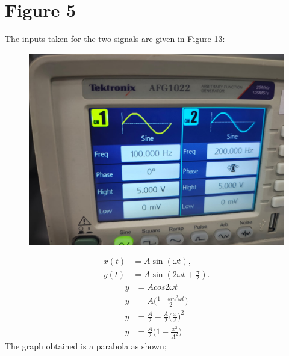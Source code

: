 \documentclass[a4paper,12pt]{article}
\numberwithin{equation}{section} %
\begin{document}
\section{Figure 5}
The inputs taken for the two signals are given in Figure 13:
\begin{figure}[h!]
    \centering
    \includegraphics[width=0.5\linewidth]{Tables/Table3.jpeg} 
    \caption{}
\end{figure}
\begin{align}
    x(t) &= A \sin (\omega t), \\
    y(t) &= A \sin (2\omega t+\frac{\pi}{2}).
\end{align}
\begin{align}
    y&=Acos{2 \omega t}\\
    y&=A \bigg(\frac{1-sin^2{\omega t}}{2}\bigg)\\
    y&=\frac{A}{2}-\frac{A}{2}\bigg(\frac{x}{A}\bigg)^2\\
    y&=\frac{A}{2}\bigg(1-\frac{x^2}{A^2}\bigg)
\end{align}
The graph obtained is a parabola as shown;
\end{document}
